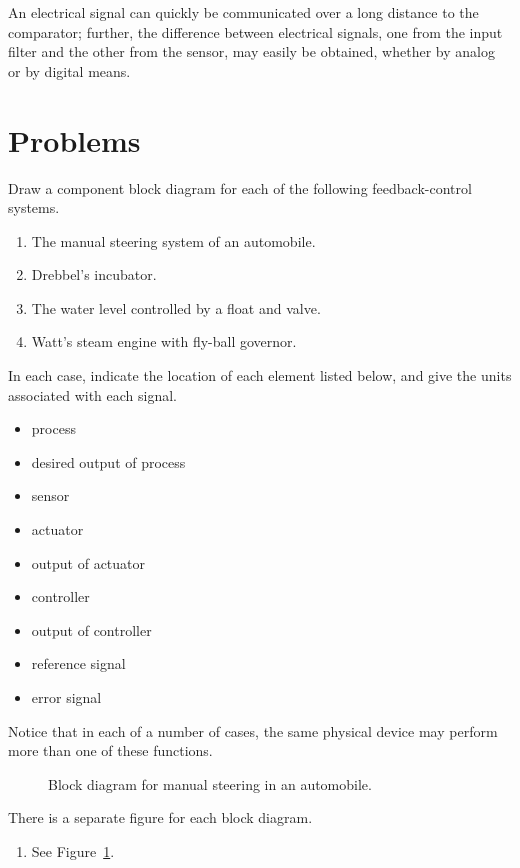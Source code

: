 \begin{solution}
   An electrical signal can quickly be communicated over a long distance to the
   comparator; further, the difference between electrical signals, one from the
   input filter and the other from the sensor, may easily be obtained, whether
   by analog or by digital means.
\end{solution}

\section{Problems}

\begin{problem}
   Draw a component block diagram for each of the following feedback-control
   systems.
   \begin{enumerate}
      \item The manual steering system of an automobile.
      \item Drebbel's incubator.
      \item The water level controlled by a float and valve.
      \item Watt's steam engine with fly-ball governor.
   \end{enumerate}
   In each case, indicate the location of each element listed below, and give
   the units associated with each signal.
   \begin{itemize}
      \item process
      \item desired output of process
      \item sensor
      \item actuator
      \item output of actuator
      \item controller
      \item output of controller
      \item reference signal
      \item error signal
   \end{itemize}
   Notice that in each of a number of cases, the same physical device may
   perform more than one of these functions.
\end{problem}

\begin{figure}
   \begin{center}
      \resizebox{0.95\columnwidth}{!}{}
      \caption{Block diagram for manual steering in an automobile.}
      \label{fig:manual-steering}
   \end{center}
\end{figure}

\begin{solution}
   There is a separate figure for each block diagram.
   \begin{enumerate}
      \item See Figure~\ref{fig:manual-steering}.
   \end{enumerate}
\end{solution}

